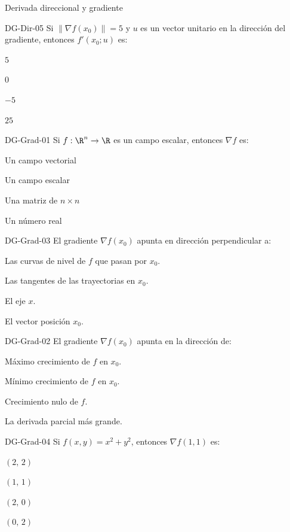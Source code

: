 \documentclass[a4,11pt]{aleph-notas}
\begin{document}
\begin{quiz}{Derivada direccional y gradiente}
\begin{multi}[]%
    {DG-Dir-05}
    Si $\|\nabla f({x}_0)\| = 5$ y ${u}$ es un vector unitario en la dirección del gradiente, entonces $f'({x}_0;{u})$ es:
    \item* $5$
    \item $0$
    \item $-5$
    \item $25$
\end{multi}

\begin{multi}[]%
    {DG-Grad-01}
    Si $f:\R^n\to\R$ es un campo escalar, entonces $\nabla f$ es:
    \item* Un campo vectorial
    \item Un campo escalar
    \item Una matriz de $n\times n$
    \item Un número real
\end{multi}

\begin{multi}[]%
    {DG-Grad-03}
    El gradiente $\nabla f({x}_0)$ apunta en dirección perpendicular a:
    \item* Las curvas de nivel de $f$ que pasan por ${x}_0$.
    \item Las tangentes de las trayectorias en ${x}_0$.
    \item El eje $x$.
    \item El vector posición ${x}_0$.
\end{multi}

\begin{multi}[]%
    {DG-Grad-02}
    El gradiente $\nabla f({x}_0)$ apunta en la dirección de:
    \item* Máximo crecimiento de $f$ en ${x}_0$.
    \item Mínimo crecimiento de $f$ en ${x}_0$.
    \item Crecimiento nulo de $f$.
    \item La derivada parcial más grande.
\end{multi}

\begin{multi}[]%
    {DG-Grad-04}
    Si $f(x,y) = x^2 + y^2$, entonces $\nabla f(1,1)$ es:
    \item* $(2,\, 2)$
    \item $(1,\, 1)$
    \item $(2,\, 0)$
    \item $(0,\, 2)$
\end{multi}


\end{quiz}
\end{document}
